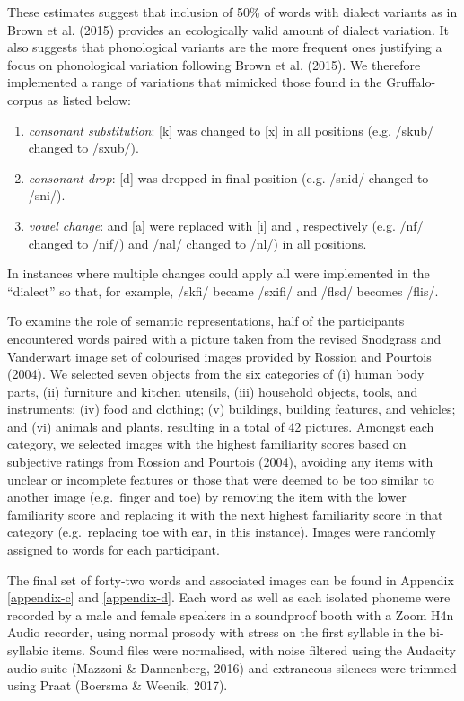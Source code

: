 \documentclass[doc,floatsintext]{apa6}
\begin{document}
These estimates suggest that inclusion of 50\% of words with dialect
variants as in Brown et al. (2015) provides an ecologically valid amount
of dialect variation. It also suggests that phonological variants are
the more frequent ones justifying a focus on phonological variation
following Brown et al. (2015). We therefore implemented a range of
variations that mimicked those found in the Gruffalo-corpus as listed
below:

\begin{enumerate}
\def\labelenumi{(\alph{enumi})}
\item
  \emph{consonant substitution}: {[}k{]} was changed to {[}x{]} in all
  positions (e.g. /skub/ changed to /sxub/).
\item
  \emph{consonant drop}: {[}d{]} was dropped in final position (e.g.
  /snid/ changed to /sni/).
\item
  \emph{vowel change}: \textipa{[E]} and {[}a{]} were replaced with
  {[}i{]} and \textipa{[O]}, respectively (e.g. /nf/ changed
  to /nif/) and /nal/ changed to /nl/) in all positions.
\end{enumerate}

In instances where multiple changes could apply all were implemented in
the \enquote{dialect} so that, for example, /skfi/ became
/sxifi/ and /flsd/ becomes /flis/.

To examine the role of semantic representations, half of the
participants encountered words paired with a picture taken from the
revised Snodgrass and Vanderwart image set of colourised images provided
by Rossion and Pourtois (2004). We selected seven objects from the six
categories of (i) human body parts, (ii) furniture and kitchen utensils,
(iii) household objects, tools, and instruments; (iv) food and clothing;
(v) buildings, building features, and vehicles; and (vi) animals and
plants, resulting in a total of 42 pictures. Amongst each category, we
selected images with the highest familiarity scores based on subjective
ratings from Rossion and Pourtois (2004), avoiding any items with
unclear or incomplete features or those that were deemed to be too
similar to another image (e.g.~finger and toe) by removing the item with
the lower familiarity score and replacing it with the next highest
familiarity score in that category (e.g.~replacing toe with ear, in this
instance). Images were randomly assigned to words for each participant.

The final set of forty-two words and associated images can be found in
Appendix \ref{appendix-c} and \ref{appendix-d}. Each word as well as
each isolated phoneme were recorded by a male and female speakers in a
soundproof booth with a Zoom H4n Audio recorder, using normal prosody
with stress on the first syllable in the bi-syllabic items. Sound files
were normalised, with noise filtered using the Audacity audio suite
(Mazzoni \& Dannenberg, 2016) and extraneous silences were trimmed using
Praat (Boersma \& Weenik, 2017).
\end{document}
